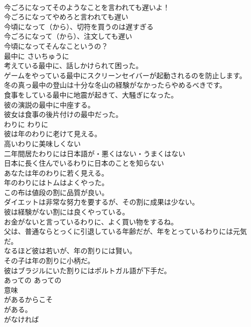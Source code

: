 \documentclass[8pt]{extreport}
\begin{document}
\begin{CJK}{UTF8}{min}
\\	今ごろになってそのようなことを言われても遅いよ！  
\\	今ごろになってやめろと言われても遅い  
\\	今頃になって（から）、切符を買うのは遅すぎる  
\\	今ごろになって（から）、注文しても遅い   
\\	今頃になってそんなこというの？  
\\	最中に	さいちゅうに	
\\	考えている最中に、話しかけられて困った。  
\\	[スクリーンセイバーのオフ] ゲームをやっている最中にスクリーンセイバーが起動されるのを防止します。   
\\	冬の真っ最中の登山は十分な冬山の経験がなかったらやめるべきです。  
\\	食事をしている最中に地震が起きて、大騒ぎになった。  
\\	彼の演説の最中に中座する。   
\\	彼女は食事の後片付けの最中だった。   
\\	わりに	わりに	
\\	彼は年のわりに老けて見える。  
\\	高いわりに美味しくない  
\\	二年間居たわりには日本語が・悪くはない・うまくはない  
\\	日本に長く住んでいるわりに日本のことを知らない  
\\	あなたは年のわりに若く見える。  
\\	年のわりにはトムはよくやった。  
\\	この布は値段の割に品質が良い。  
\\	ダイエットは非常な努力を要するが、その割に成果は少ない。  
\\	彼は経験がない割には良くやっている。  
\\	お金がないと言っているわりに、よく買い物をするね。  
\\	父は、普通ならとっくに引退している年齢だが、年をとっているわりには元気だ。  
\\	なるほど彼は若いが、年の割りには賢い。  
\\	その子は年の割りに小柄だ。   
\\	彼はブラジルにいた割りにはポルトガル語が下手だ。   
\\	あっての	あっての	
\\	意味 
\\	があるからこそ
\\	がある。
\\	がなければ

\end{CJK}
\end{document}
